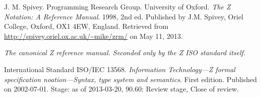 \begin{thebibliography}{9} %


J. M. Spivey. Programming Research Group. University of Oxford. \emph{The Z
Notation: A Reference Manual}. 1998, 2nd ed. Published by J.M. Spivey, Oriel
College, Oxford, OX1 4EW, England. Retrieved from
\url{http://spivey.oriel.ox.ac.uk/~mike/zrm/} on May 11, 2013.

\emph{The canonical Z reference manual. Seconded only by the Z ISO standard
itself.}


International Standard ISO/IEC 13568. \emph{Information Technology---Z formal
specification noation---Syntax, type system and semantics}. First edition.
Published on 2002-07-01. Stage: as of 2013-03-20, 90.60: Review stage, Close of
review.

\end{thebibliography}

